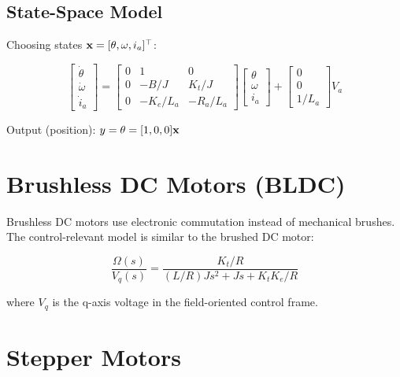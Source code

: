 \subsection{State-Space Model}

Choosing states $\mathbf{x} = [\theta, \omega, i_a]^\top$:

\begin{equation}
\begin{bmatrix} \dot{\theta} \\ \dot{\omega} \\ \dot{i}_a \end{bmatrix} =
\begin{bmatrix}
0 & 1 & 0 \\
0 & -B/J & K_t/J \\
0 & -K_e/L_a & -R_a/L_a
\end{bmatrix}
\begin{bmatrix} \theta \\ \omega \\ i_a \end{bmatrix} +
\begin{bmatrix} 0 \\ 0 \\ 1/L_a \end{bmatrix} V_a
\end{equation}

Output (position): $y = \theta = [1, 0, 0]\mathbf{x}$

\section{Brushless DC Motors (BLDC)}
\label{sec:bldc}

Brushless DC motors use electronic commutation instead of mechanical brushes. The control-relevant model is similar to the brushed DC motor:

\begin{equation}
\frac{\Omega(s)}{V_q(s)} = \frac{K_t/R}{(L/R)Js^2 + Js + K_t K_e/R}
\end{equation}

where $V_q$ is the q-axis voltage in the field-oriented control frame.

\section{Stepper Motors}
\label{sec:stepper}

